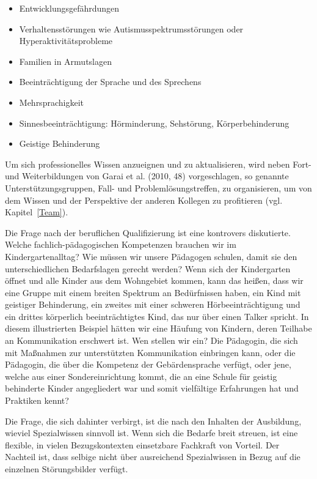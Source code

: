 \begin{itemize}
\item Entwicklungsgefährdungen
\item Verhaltensstörungen wie Autismusspektrumsstörungen oder Hyperaktivitätsprobleme
\item Familien in Armutslagen
\item Beeinträchtigung der Sprache und des Sprechens
\item Mehrsprachigkeit
\item Sinnesbeeinträchtigung: Hörminderung, Sehstörung, Körperbehinderung
\item Geistige Behinderung
\end{itemize} 

Um sich professionelles Wissen anzueignen und zu aktualisieren, wird neben Fort- und Weiterbildungen von Garai et al. (2010, 48) vorgeschlagen, so genannte Unterstützungsgruppen, Fall- und Problemlösungstreffen, zu organisieren, um von dem Wissen und der Perspektive der anderen Kollegen zu profitieren (vgl. Kapitel~\ref{Team}).

Die Frage nach der beruflichen Qualifizierung ist eine kontrovers diskutierte. Welche fachlich-pädagogischen Kompetenzen brauchen wir im Kindergartenalltag? Wie müssen wir unsere Pädagogen schulen, damit sie den unterschiedlichen Bedarfslagen gerecht werden? Wenn sich der Kindergarten öffnet und alle Kinder aus dem Wohngebiet kommen, kann das heißen, dass wir eine Gruppe mit einem breiten Spektrum an Bedürfnissen haben, ein Kind mit geistiger Behinderung, ein zweites mit einer schweren Hörbeeinträchtigung und ein drittes körperlich beeinträchtigtes Kind, das nur über einen Talker spricht.
In diesem illustrierten Beispiel hätten wir eine Häufung von Kindern, deren Teilhabe an Kommunikation erschwert ist. Wen stellen wir ein? Die Pädagogin, die sich mit Maßnahmen zur unterstützten Kommunikation einbringen kann, oder die Pädagogin, die über die Kompetenz der Gebärdensprache verfügt, oder jene, welche aus einer Sondereinrichtung kommt, die an eine Schule für geistig behinderte Kinder angegliedert war und somit vielfältige Erfahrungen hat und Praktiken kennt? 

Die Frage, die sich dahinter verbirgt, ist die nach den Inhalten der Ausbildung, wieviel Spezialwissen sinnvoll ist. Wenn sich die Bedarfe breit streuen, ist eine flexible, in vielen Bezugskontexten einsetzbare Fachkraft von Vorteil. Der Nachteil ist, dass selbige nicht über ausreichend Spezialwissen in Bezug auf die einzelnen Störungsbilder verfügt.

